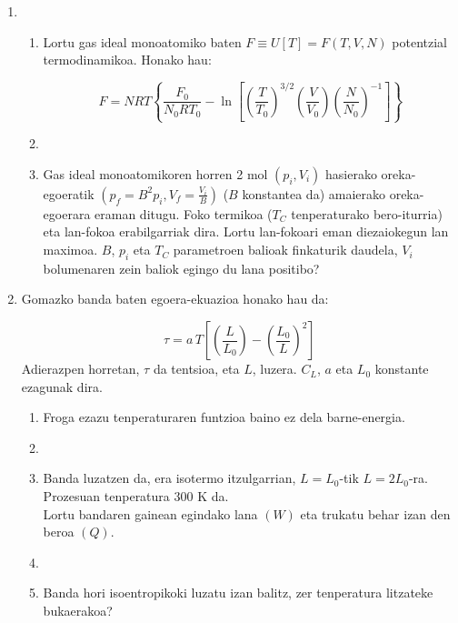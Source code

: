\documentclass[10pt]{article}              %
\begin{document}
\begin{enumerate}
\vspace{3cm}

\item 
\begin{enumerate}
\item Lortu gas ideal monoatomiko baten $F\equiv U\left[T\right]=F\left(T,V,N\right)$ potentzial termodinamikoa. Honako hau:  

$$F = N R T \left\{ \frac {F_{0}}{N_{0}RT_{0}} - \ln \left[ \left( \frac {T}{T_{0}} \right) ^ {3/2} \left( \frac {V}{V_{0}} \right) \left(\frac{N}{N_{0}} \right)^{-1} \right] \right\}$$

\item[]

\item Gas ideal monoatomikoren horren 2 mol $(p_{i}, V_{i})$ hasierako oreka-egoeratik $(p_{f}=B^{2}p_{i}, V_{f}=\frac{V_{i}}{B})$ ($B$ konstantea da) amaierako oreka-egoerara eraman ditugu. Foko termikoa ($T_{C}$ tenperaturako bero-iturria) eta lan-fokoa erabilgarriak dira. Lortu lan-fokoari eman diezaiokegun lan maximoa. $B$, $p_{i}$ eta $T_{C}$ parametroen balioak finkaturik daudela, $V_{i}$ bolumenaren zein baliok egingo du lana positibo?
\end{enumerate}

\cleardoublepage

\item Gomazko banda baten egoera-ekuazioa honako hau da:

$$ \tau = a\, T \left[ \left(\frac{L}{L_{0}}\right) - \left(\frac{L_{0}}{L}\right)^{2} \right]$$
Adierazpen horretan, $\tau$ da tentsioa, eta $L$, luzera. $C_{L}$, $a$ eta $L_{0}$ konstante ezagunak dira.
\begin{enumerate}
\item Froga ezazu tenperaturaren funtzioa baino ez dela barne-energia.
\item[]
\item Banda luzatzen da, era isotermo itzulgarrian, $L = L_{0}$-tik $L = 2L_{0}$-ra.\\
Prozesuan tenperatura 300 K da.\\
Lortu bandaren gainean egindako lana $(W)$ eta trukatu behar izan den beroa $(Q)$.
\item[]
\item Banda hori isoentropikoki luzatu izan balitz, zer tenperatura litzateke bukaerakoa?
\end{enumerate}

\vspace{5cm}


\end{enumerate}
\end{document}
